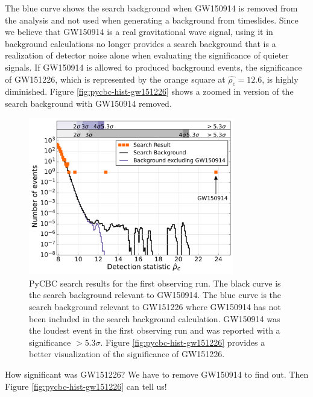 The blue curve shows the search background when GW150914 is removed 
from the analysis and not used when generating a background from 
timeslides. Since we believe that GW150914 is a real gravitational wave 
signal, using it in background calculations no longer provides a 
search background that is a realization of detector noise alone 
when evaluating the significance of quieter signals. 
If GW150914 is allowed to produced background events, the 
significance of GW151226, which is represented by the orange square at 
$\hat{\rho_c} = 12.6$, is highly diminished. 
Figure \ref{fig:pycbc-hist-gw151226} shows a zoomed in version 
of the search background with GW150914 removed.

\begin{figure}[ht!]%
\includegraphics[width=0.8\textwidth]{figures/O1/pycbc_hist_GW150914}
\caption[PyCBC result histograms for GW150914]{PyCBC search results for %
         the first observing run. The black curve is the search background %
         relevant to GW150914. The blue curve is the search background %
         relevant to GW151226 where GW150914 has not been included in the %
         search background calculation. GW150914 was the loudest event in %
         the first observing run and was reported with a significance %
         $> 5.3\sigma$. Figure \ref{fig:pycbc-hist-gw151226} provides %
         a better visualization of the significance of GW151226.}
\label{fig:pycbc-hist-gw150914}
\end{figure}

How significant was GW151226? We have to remove GW150914 to find out. 
Then Figure \ref{fig:pycbc-hist-gw151226} can tell us!

